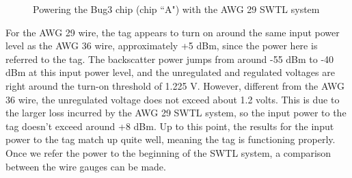 \documentclass[12pt,onecolumn,titlepage]{article}
\begin{document}
\begin{figure}[htbp]
	\centering
		\quad
		
	\label{fig:SWTL_w_tag_AWG29}
	\caption{Powering the Bug3 chip (chip ``A") with the AWG 29 SWTL system }
\end{figure}



For the AWG 29 wire, the tag appears to turn on around the same input power level as the AWG 36 wire, approximately +5 dBm, since the power here is referred to the tag. The backscatter power jumps from around -55 dBm to -40 dBm at this input power level, and the unregulated and regulated voltages are right around the turn-on threshold of 1.225 V. However, different from the AWG 36 wire, the unregulated voltage does not exceed about 1.2 volts. This is due to the larger loss incurred by the AWG 29 SWTL system, so the input power to the tag doesn't exceed around +8 dBm. Up to this point, the results for the input power to the tag match up quite well, meaning the tag is functioning properly. Once we refer the power to the beginning of the SWTL system, a comparison between the wire gauges can be made.
\end{document}
